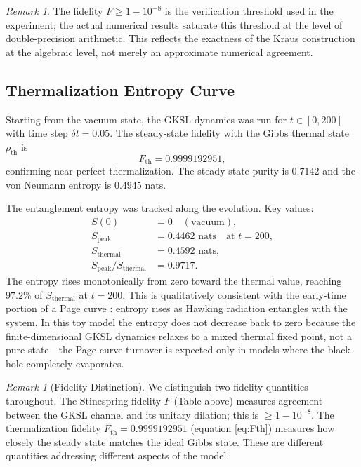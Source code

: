 \documentclass[11pt,twocolumn]{article}
\theoremstyle{remark}
\newtheorem{remark}[theorem]{Remark}
\begin{document}
\begin{remark}
The fidelity $F \geq 1-10^{-8}$ is the verification threshold used in
the experiment; the actual numerical results saturate this threshold at
the level of double-precision arithmetic. This reflects the exactness
of the Kraus construction at the algebraic level, not merely an
approximate numerical agreement.
\end{remark}

\subsection{Thermalization Entropy Curve}

Starting from the vacuum state, the GKSL dynamics was run for $t \in
[0,200]$ with time step $\delta t = 0.05$. The steady-state fidelity
with the Gibbs thermal state $\rho_{\mathrm{th}}$ is
\begin{equation}
  F_{\mathrm{th}} = 0.9999192951,
  \label{eq:Fth}
\end{equation}
confirming near-perfect thermalization. The steady-state purity is
$0.7142$ and the von Neumann entropy is $0.4945$ nats.

The entanglement entropy was tracked along the evolution. Key values:
\begin{align*}
  S(0) &= 0 \quad (\text{vacuum}), \\
  S_{\mathrm{peak}} &= 0.4462 \text{ nats} \quad \text{at } t = 200, \\
  S_{\mathrm{thermal}} &= 0.4592 \text{ nats}, \\
  S_{\mathrm{peak}}/S_{\mathrm{thermal}} &= 0.9717.
\end{align*}
The entropy rises monotonically from zero toward the thermal value,
reaching $97.2\%$ of $S_{\mathrm{thermal}}$ at $t=200$. This is
qualitatively consistent with the early-time portion of a Page curve
\cite{Page1993}: entropy rises as Hawking radiation entangles with the
system. In this toy model the entropy does not decrease back to zero
because the finite-dimensional GKSL dynamics relaxes to a mixed thermal
fixed point, not a pure state---the Page curve turnover is expected only
in models where the black hole completely evaporates.

\begin{remark}[Fidelity Distinction]
We distinguish two fidelity quantities throughout. The Stinespring
fidelity $F$ (Table above) measures agreement between the GKSL channel
and its unitary dilation; this is $\geq 1-10^{-8}$. The thermalization
fidelity $F_{\mathrm{th}} = 0.9999192951$ (equation \eqref{eq:Fth})
measures how closely the steady state matches the ideal Gibbs state.
These are different quantities addressing different aspects of the model.
\end{remark}
\end{document}
